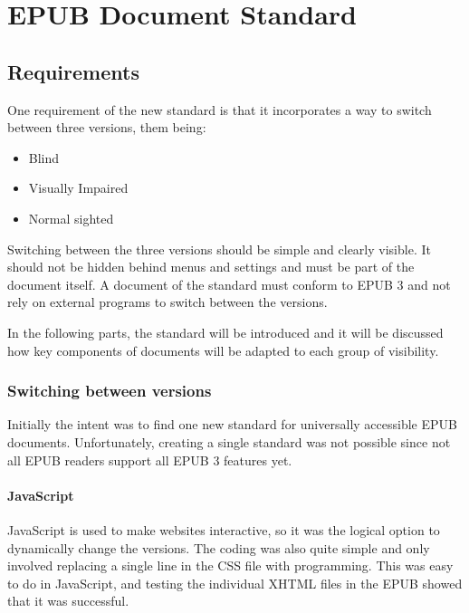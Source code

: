 \chapter{EPUB Document Standard}
\label{ch:EPUB Document Standard}

\section{Requirements}

One requirement of the new standard is that it incorporates a way to switch between three versions, them being:

\begin{itemize}
	\item Blind
	\item Visually Impaired
	\item Normal sighted
\end{itemize}

Switching between the three versions should be simple and clearly visible. It should not be hidden behind menus and settings and must be part of the document itself. A document of the standard must conform to EPUB 3 and not rely on external programs to switch between the versions.

In the following parts, the standard will be introduced and it will be discussed how key components of documents will be adapted to each group of visibility.


\subsection{Switching between versions}

Initially the intent was to find one new standard for universally accessible EPUB documents. Unfortunately, creating a single standard was not possible since not all EPUB readers support all EPUB 3 features yet.

\subsubsection{JavaScript}
JavaScript is used to make websites interactive, so it was the logical option to dynamically change the versions. The coding was also quite simple and only involved replacing a single line in the CSS file with programming. This was easy to do in JavaScript, and testing the individual XHTML files in the EPUB showed that it was successful. 

